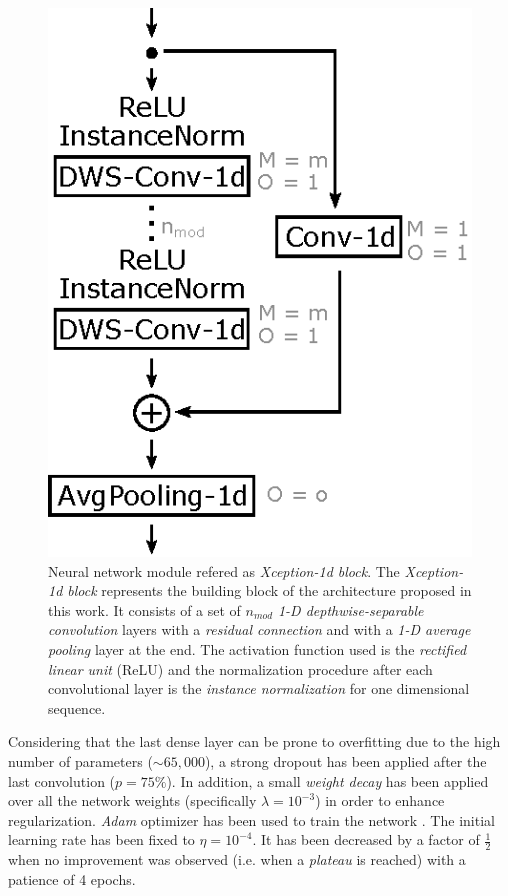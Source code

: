 \begin{figure}[ht]
	\centering
	\includegraphics[width=0.4\linewidth]{kws/images/xception_module.eps}
	\caption[\textit{Xception-1d} architecture building block]{Neural network module refered as \textit{Xception-1d block}. The \textit{Xception-1d block} represents the building block of the architecture proposed in this work. It consists of a set of $n_{mod}$ \textit{1-D depthwise-separable convolution} layers with a \textit{residual connection} and with a \textit{1-D average pooling} layer at the end. The activation function used is the \textit{rectified linear unit} (ReLU) and the normalization procedure after each convolutional layer is the \textit{instance normalization} for one dimensional sequence.}
	\label{fig:xceptionmodule}
\end{figure}



Considering that the last dense layer can be prone to overfitting due to the high number of parameters ($\sim 65,000$), a strong dropout \autocite{srivastava2014, Goodfellow2016} has been applied after the last convolution ($p = 75\%$). In addition, a small \textit{weight decay} \autocite{Krogh1991, haykin1998, Goodfellow2016} has been applied over all the network weights (specifically $\lambda = 10^{-3}$) in order to enhance regularization. \textit{Adam} optimizer has been used to train the network \autocite{kingma14}. The initial learning rate has been fixed to $\eta = 10^{-4}$. It has been decreased by a factor of $\frac{1}{2}$ when no improvement was observed (i.e. when a \textit{plateau} is reached) with a patience of 4 epochs.



